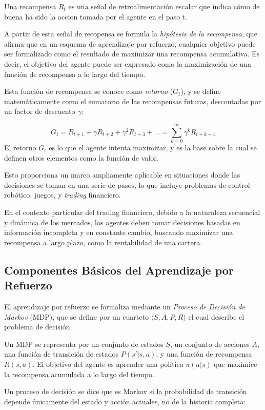 \documentclass[a4paper,12pt]{report}
\begin{document}
Una recompensa \(R_t\) es una señal de retroalimentación escalar que indica cómo de buena ha sido la accion 
tomada por el agente en el paso \(t\). 

A partir de esta señal de recopensa se formula
la \textit{hipótesis de la recompensa}, que afirma que en un esquema de aprendizaje por refuerzo, cualquier 
objetivo puede ser formalizado como el resultado de maximizar una recompensa acumulativa. Es decir, el objetivo del agente puede ser expresado como la maximización de una función de recompensa a lo 
largo del tiempo.

Esta función de recompensa se conoce como \textit{retorno} (\(G_t\)), y se define matemáticamente como el sumatorio
de las recompensas futuras, descontadas por un factor de descuento  \(\gamma\):

\[
G_t = R_{t+1} + \gamma R_{t+2} + \gamma^2 R_{t+3} + \dots = \sum_{k=0}^{\infty} \gamma^k R_{t+k+1}
\]
El retorno \(G_t\) es lo que el agente intenta maximizar, y es la base sobre la cual se definen otros elementos como la función de valor.


Esto proporciona un marco ampliamente aplicable en situaciones donde 
las decisiones se toman en una serie de pasos, lo que incluye problemas de control robótico, juegos, 
y \textit{trading} financiero.

En el contexto particular del trading financiero, debido a la naturaleza secuencial y dinámica de 
los mercados, los agentes deben tomar decisiones basadas en información incompleta y en constante 
cambio, buscando maximizar una recompensa a largo plazo, como la rentabilidad de una cartera.


\subsection{Componentes Básicos del Aprendizaje por Refuerzo}

El aprendizaje por refuerzo se formaliza mediante un \textit{Proceso de Decisión de Markov} (MDP), 
que se define por un cuarteto \(\langle S, A, P, R \rangle\) el cual describe el problema de decisión.

Un MDP se representa por un conjunto de estados \(S\), 
un conjunto de acciones \(A\), una función de transición de estados \(P(s'|s, a)\), y una función de 
recompensa \(R(s, a)\). El objetivo del agente es aprender una política \(\pi(a|s)\) que maximice la 
recompensa acumulada a lo largo del tiempo.

Un proceso de decisión se dice que es Markov si la probabilidad de transición depende únicamente
del estado y acción actuales, no de la historia completa:
\end{document}
